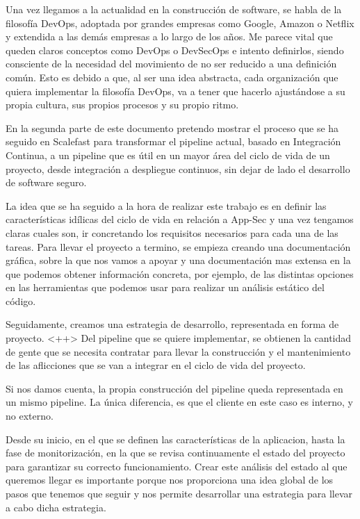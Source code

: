 \documentclass[12pt]{report} %
\begin{document}
Una vez llegamos a la actualidad en la construcción de software, se habla de la
filosofía DevOps, adoptada por grandes empresas como Google, Amazon o Netflix y
extendida a las demás empresas a lo largo de los años.
Me parece vital que queden claros conceptos como \gls{DevOps} o \gls{DevSecOps}
e intento definirlos, siendo consciente de la necesidad del movimiento de no 
ser reducido a una definición común.
Esto es debido a que, al ser una idea abstracta, cada organización que quiera
implementar la filosofía DevOps, va a tener que hacerlo ajustándose a su propia
cultura, sus propios procesos y su propio ritmo.

En la segunda parte de este documento pretendo mostrar el proceso que se ha
seguido en Scalefast para transformar el pipeline actual, basado en Integración
Continua, a un \gls{pipeline} que es útil en un mayor área del ciclo de vida
de un proyecto, desde integración a despliegue continuos, sin dejar de lado el
desarrollo de software seguro.

La idea que se ha seguido a la hora de realizar este trabajo es en definir las
características idílicas del ciclo de vida en relación a \gls{App-Sec} y una 
vez tengamos claras cuales son, ir concretando los requisitos necesarios para
cada una de las tareas.
Para llevar el proyecto a termino, se empieza creando una documentación 
gráfica, sobre la que nos vamos a apoyar y una documentación mas extensa en la
que podemos obtener información concreta, por ejemplo, de las distintas 
opciones en las herramientas que podemos usar para realizar un análisis 
estático del código.

Seguidamente, creamos una estrategia de desarrollo, representada en forma de
proyecto. <++>
Del pipeline que se quiere implementar, se obtienen la cantidad de gente que se
necesita contratar para llevar la construcción y el mantenimiento de las
aflicciones que se van a integrar en el ciclo de vida del proyecto.

Si nos damos cuenta, la propia construcción del pipeline queda representada en
un mismo pipeline.
La única diferencia, es que el cliente en este caso es interno, y no externo.

Desde su inicio, en el que se definen las características de la aplicacion,
hasta la fase de monitorización, en la que se revisa continuamente el estado 
del proyecto para garantizar su correcto funcionamiento.
Crear este análisis del estado al que queremos llegar es importante porque nos
proporciona una idea global de los pasos que tenemos que seguir y nos permite
desarrollar una estrategia para llevar a cabo dicha estrategia.
\end{document}
